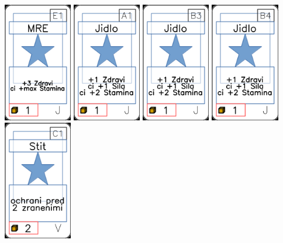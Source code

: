 \documentclass[a4paper]{article}
\begin{document}
	\includegraphics[width=3.0cm]{img-1_20}
	\includegraphics[width=3.0cm]{img-1_0}
	\includegraphics[width=3.0cm]{img-1_7}
	\includegraphics[width=3.0cm]{img-1_8}
	\includegraphics[width=3.0cm]{img-1_70}
\end{document}
